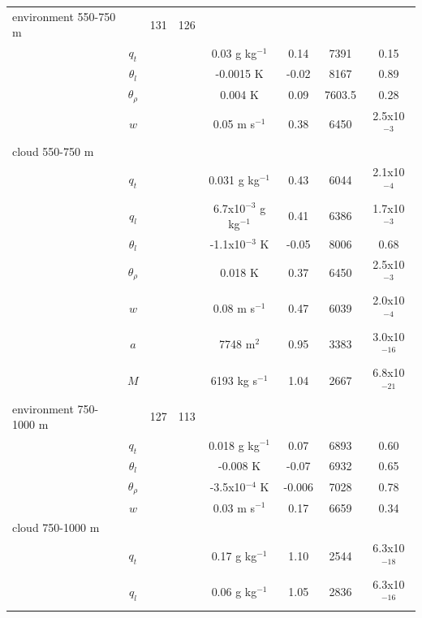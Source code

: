 \documentclass[acp]{copernicus}
\begin{document}
\begin{table}[t]
\begin{tabular}{lccccccc}
\middlehline
environment 550-750 m & & 131 & 126 & & & & \\
& $q_t$       & & & 0.03 g kg$^{-1}$ &  0.14 & 7391  &  0.15 \\
& $\theta_l$ & & & -0.0015 K                   & -0.02 & 8167 & 0.89 \\
& $\theta_\rho$ & & & 0.004 K               & 0.09 & 7603.5  & 0.28    \\
\rowcolor[gray]{0.95}
& $w$         & & &  0.05 m s$^{-1}$         &  0.38 & 6450 & 2.5x10$^{-3}$ \\
\middlehline
cloud 550-750 m & & & & & & \\
\rowcolor[gray]{0.85}
& $q_t$       & & &  0.031 g kg$^{-1}$         &  0.43 & 6044  & 2.1x10$^{-4}$ \\
\rowcolor[gray]{0.85}
& $q_l$       & & &  6.7x10$^{-3}$ g kg$^{-1}$ &  0.41 & 6386  & 1.7x10$^{-3}$  \\
& $\theta_l$ & & & -1.1x10$^{-3}$ K           & -0.05 & 8006  & 0.68 \\
\rowcolor[gray]{0.95}
& $\theta_\rho$ & & &  0.018 K               &  0.37 & 6450  & 2.5x10$^{-3}$ \\
\rowcolor[gray]{0.85}
& $w$         & & &  0.08 m s$^{-1}$           &  0.47 & 6039  & 2.0x10$^{-4}$ \\
\rowcolor[gray]{0.85}
& $a$         & & &  7748 m$^2$                &  0.95 & 3383 & 3.0x10$^{-16}$ \\
\rowcolor[gray]{0.85}
& $M$         & & &  6193 kg s$^{-1}$    &  1.04 & 2667 & 6.8x10$^{-21}$ \\
\middlehline
environment 750-1000 m & & 127 & 113 & & & & \\
& $q_t$       & & &  0.018 g kg$^{-1}$         &  0.07 & 6893 & 0.60 \\
& $\theta_l$ & & & -0.008 K                   & -0.07 & 6932 & 0.65 \\
& $\theta_\rho$ & & & -3.5x10$^{-4}$ K       & -0.006 & 7028 & 0.78 \\
& $w$         & & &  0.03 m s$^{-1}$           &  0.17 & 6659 & 0.34 \\
\middlehline
cloud 750-1000 m & & & & & &          \\
\rowcolor[gray]{0.85}
& $q_t$       & & &  0.17 g kg$^{-1}$        &  1.10 & 2544   & 6.3x10$^{-18}$ \\
\rowcolor[gray]{0.85}
& $q_l$       & & &  0.06 g kg$^{-1}$        &  1.05 & 2836   & 6.3x10$^{-16}$ \\

\end{tabular}
\end{table}
\end{document}
